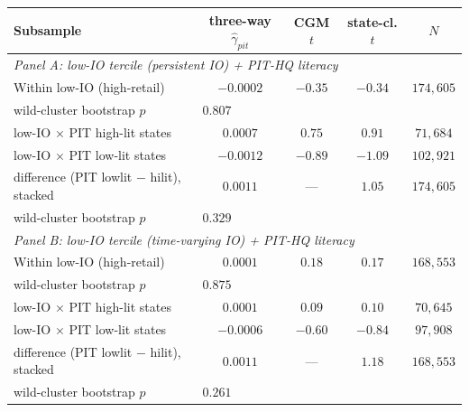 \begin{tabular}{lcccc}
\hline\hline
Subsample & three-way $\hat\gamma_{pit}$ & CGM $t$ & state-cl. $t$ & $N$ \\
\hline
\multicolumn{5}{l}{\textit{Panel A: low-IO tercile (persistent IO) + PIT-HQ literacy}} \\
Within low-IO (high-retail) & $-0.0002$ & $-0.35$ & $-0.34$ & $174,605$ \\
\quad wild-cluster bootstrap $p$ & \multicolumn{4}{l}{$0.807$} \\
\quad low-IO $\times$ PIT high-lit states & $0.0007$ & $0.75$ & $0.91$ & $71,684$ \\
\quad low-IO $\times$ PIT low-lit states & $-0.0012$ & $-0.89$ & $-1.09$ & $102,921$ \\
\quad difference (PIT lowlit $-$ hilit), stacked & $0.0011$ & --- & $1.05$ & $174,605$ \\
\quad\quad wild-cluster bootstrap $p$ & \multicolumn{4}{l}{$0.329$} \\
\hline
\multicolumn{5}{l}{\textit{Panel B: low-IO tercile (time-varying IO) + PIT-HQ literacy}} \\
Within low-IO (high-retail) & $0.0001$ & $0.18$ & $0.17$ & $168,553$ \\
\quad wild-cluster bootstrap $p$ & \multicolumn{4}{l}{$0.875$} \\
\quad low-IO $\times$ PIT high-lit states & $0.0001$ & $0.09$ & $0.10$ & $70,645$ \\
\quad low-IO $\times$ PIT low-lit states & $-0.0006$ & $-0.60$ & $-0.84$ & $97,908$ \\
\quad difference (PIT lowlit $-$ hilit), stacked & $0.0011$ & --- & $1.18$ & $168,553$ \\
\quad\quad wild-cluster bootstrap $p$ & \multicolumn{4}{l}{$0.261$} \\
\hline\hline
\end{tabular}

